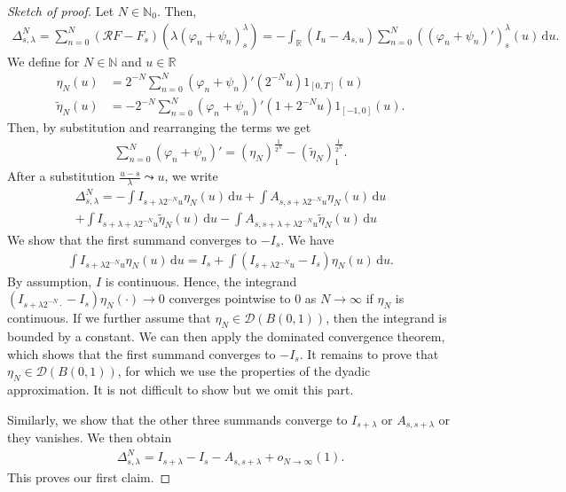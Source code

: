 \begin{proof}[Sketch of proof]
  Let \( N \in \mathbb{N}_0 \). Then, 
  \begin{align*}
    \Delta^N_{s, \lambda} = \sum^N_{n=0} (\mathcal{R}F - F_s)(\lambda(\varphi_n + \psi_n)_s^\lambda) = - \int_{\mathbb{R}} (I_u - A_{s,u}) \sum^N_{n=0} \left( (\varphi_n + \psi_n)' \right)^\lambda_s (u) \, \mathrm{d}u.
  \end{align*}
  We define for \( N \in \mathbb{N} \) and \( u \in \mathbb{R} \)
  \begin{align*}
    \eta_N(u) &= 2^{-N} \sum^N_{n=0}(\varphi_n + \psi_n)'(2^{-N}u )1_{[0,T]}(u) \\
    \tilde \eta_N(u) &= -2^{-N} \sum^N_{n=0}(\varphi_n + \psi_n)'(1 + 2^{-N}u )1_{[-1,0]}(u).
  \end{align*}
  Then, by substitution and rearranging the terms we get
  \begin{align*}
    \sum^N_{n=0}(\varphi_n + \psi_n)' = (\eta_N)^{\frac{1}{2^N}} - (\tilde \eta_N)_1^{\frac{1}{2^N}}.
  \end{align*}
  After a substitution \( \frac{u-s}{\lambda} \leadsto u \), we write 
  \begin{align*}
    \Delta^N_{s,\lambda} = - \int I_{s + \lambda2^{-N}u}\eta_N(u) \, \mathrm{d}u + \int A_{s,s + \lambda2^{-N}u} \eta_N(u) \, \mathrm{d}u \\
    + \int I_{s + \lambda + \lambda2^{-N}u}\tilde \eta_N(u) \, \mathrm{d}u
    - \int  A_{s, s + \lambda + \lambda2^{-N}u} \tilde \eta_N(u) \, \mathrm{d}u 
  \end{align*}
  We show that the first summand converges to \( -I_s \). We have 
  \begin{align*}
    \int I_{s + \lambda2^{-N}u}\eta_N(u) \, \mathrm{d}u = I_s + \int (I_{s + \lambda2^{-N}u} - I_s)\eta_N(u) \, \mathrm{d}u.
  \end{align*}
  By assumption, \( I \) is continuous. Hence, the integrand \( (I_{s + \lambda2^{-N} \cdot} - I_s)\eta_N(\cdot) \to 0 \) converges pointwise to \( 0 \) as \( N \to \infty \) if \( \eta_N \) is continuous. If we further assume that \( \eta_N \in \mathcal{D}(B(0,1)) \), then the integrand is bounded by a constant. We can then apply the dominated convergence theorem, which shows that the first summand converges to \( -I_s \).  It remains to prove that \( \eta_N \in \mathcal{D}(B(0,1)) \), for which we use the properties of the dyadic approximation. It is not difficult to show but we omit this part.

  Similarly, we show that the other three summands converge to \( I_{s + \lambda} \) or \( A_{s, s+\lambda} \) or they vanishes. We then obtain 
  \begin{align*}
    \Delta^N_{s, \lambda} = I_{s + \lambda} - I_s - A_{s, s+ \lambda} + o_{N \to \infty}(1).
  \end{align*}
  This proves our first claim.


\end{proof}
